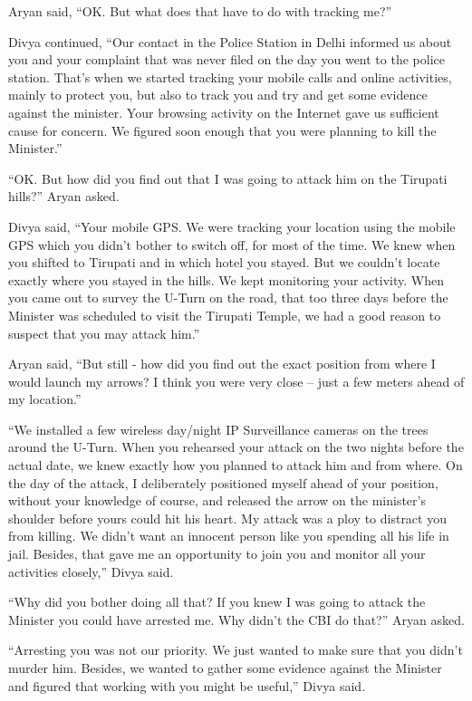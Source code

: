 Aryan said, “OK. But what does that have to do with tracking me?”

Divya continued, “Our contact in the Police Station in Delhi informed us about
you and your complaint that was never filed on the day you went to the police
station. That's when we started tracking your mobile calls and online
activities, mainly to protect you, but also to track you and try and get some
evidence against the minister. Your browsing activity on the Internet gave us
sufficient cause for concern. We figured soon enough that you were planning to
kill the Minister.”

“OK. But how did you find out that I was going to attack him on the Tirupati
hills?” Aryan asked.

Divya said, “Your mobile GPS. We were tracking your location using the mobile
GPS which you didn't bother to switch off, for most of the time. We knew when
you shifted to Tirupati and in which hotel you stayed. But we couldn't locate
exactly where you stayed in the hills. We kept monitoring your activity. When
you came out to survey the U-Turn on the road, that too three days before the
Minister was scheduled to visit the Tirupati Temple, we had a good reason to
suspect that you may attack him.”

Aryan said, “But still - how did you find out the exact position from where I
would launch my arrows? I think you were very close – just a few meters ahead of
my location.”

“We installed a few wireless day/night IP Surveillance cameras on the trees
around the U-Turn. When you rehearsed your attack on the two nights before the
actual date, we knew exactly how you planned to attack him and from where. On
the day of the attack, I deliberately positioned myself ahead of your position,
without your knowledge of course, and released the arrow on the minister's
shoulder before yours could hit his heart. My attack was a ploy to distract you
from killing. We didn't want an innocent person like you spending all his life
in jail. Besides, that gave me an opportunity to join you and monitor all your
activities closely,” Divya said.

“Why did you bother doing all that? If you knew I was going to attack the
Minister you could have arrested me. Why didn't the CBI do that?” Aryan asked.

“Arresting you was not our priority. We just wanted to make sure that you didn't
murder him. Besides, we wanted to gather some evidence against the Minister and
figured that working with you might be useful,” Divya said.

